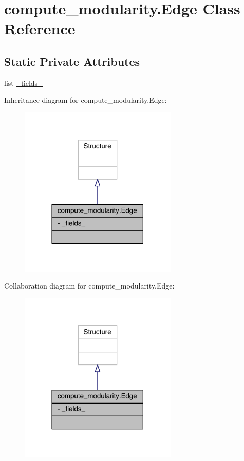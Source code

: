 \hypertarget{classcompute__modularity_1_1_edge}{\section{compute\+\_\+modularity.\+Edge Class Reference}
\label{classcompute__modularity_1_1_edge}
}
\subsection*{Static Private Attributes}
\begin{DoxyCompactItemize}
\item 
list \hyperlink{classcompute__modularity_1_1_edge_a31cc6519f01650c1c69f2ccbafd841a1}{\+\_\+fields\+\_\+}
\end{DoxyCompactItemize}


Inheritance diagram for compute\+\_\+modularity.\+Edge\+:\nopagebreak
\begin{figure}[H]
\begin{center}
\leavevmode
\includegraphics[width=213pt]{classcompute__modularity_1_1_edge__inherit__graph}
\end{center}
\end{figure}


Collaboration diagram for compute\+\_\+modularity.\+Edge\+:\nopagebreak
\begin{figure}[H]
\begin{center}
\leavevmode
\includegraphics[width=213pt]{classcompute__modularity_1_1_edge__coll__graph}
\end{center}
\end{figure}


